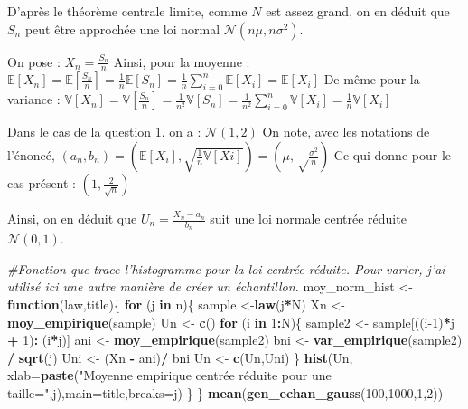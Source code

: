 \documentclass[]{article}
\newenvironment{Shaded}{\begin{snugshade}}{\end{snugshade}}
\newcommand{\CommentTok}[1]{\textcolor[rgb]{0.56,0.35,0.01}{\textit{#1}}}
\newcommand{\ControlFlowTok}[1]{\textcolor[rgb]{0.13,0.29,0.53}{\textbf{#1}}}
\newcommand{\DataTypeTok}[1]{\textcolor[rgb]{0.13,0.29,0.53}{#1}}
\newcommand{\DecValTok}[1]{\textcolor[rgb]{0.00,0.00,0.81}{#1}}
\newcommand{\KeywordTok}[1]{\textcolor[rgb]{0.13,0.29,0.53}{\textbf{#1}}}
\newcommand{\NormalTok}[1]{#1}
\newcommand{\OperatorTok}[1]{\textcolor[rgb]{0.81,0.36,0.00}{\textbf{#1}}}
\newcommand{\StringTok}[1]{\textcolor[rgb]{0.31,0.60,0.02}{#1}}
\begin{document}
D'après le théorème centrale limite, comme \(N\) est assez grand, on en
déduit que \(S_{n}\) peut être approchée une loi normal
\(\mathcal{N}(n\mu,n\sigma^{2})\).

On pose : \({X_{n}} = \frac{S_{n}}{n}\) Ainsi, pour la moyenne :
\(\mathbb{E}[ X_{n}]=\mathbb{E}[\frac{S_{n}}{n}]=\frac{1}{n}\mathbb{E}[S_{n}]=\frac{1}{n}\sum\limits_{i=0}^{n}\mathbb{E}[X_{i}]=\mathbb{E}[X_{i}]\)
De même pour la variance :
\(\mathbb{V}[{ X_{n}}]=\mathbb{V}[\frac{S_{n}}{n}]=\frac{1}{n^{2}}\mathbb{V}[S_{n}]=\frac{1}{n^{2}}\sum\limits_{i=0}^{n}\mathbb{V}[X_{i}]=\frac{1}{n}\mathbb{V}[X_{i}]\)

Dans le cas de la question 1. on a : \(\mathcal{N}(1,2)\) On note, avec
les notations de l'énoncé,
\((a_{n},b_{n})=(\mathbb{E}[X_i],\sqrt{\frac{1}{n}\mathbb{V}[Xi]})=(\mu,\sqrt\frac{\sigma^{2}}{n})\)
Ce qui donne pour le cas présent : \((1,\frac{2}{\sqrt{n}})\)

Ainsi, on en déduit que \(U_{n}=\frac{{X_{n}} - a_{n}}{b_{n}}\) suit une
loi normale centrée réduite \(\mathcal{N}(0,1)\).

\begin{Shaded}
\begin{Highlighting}[]
\CommentTok{#Fonction que trace l'histogramme pour la loi centrée réduite. Pour varier, j'ai utilisé ici une autre manière de créer un échantillon.}
\NormalTok{moy_norm_hist <-}\StringTok{ }\ControlFlowTok{function}\NormalTok{(law,title)\{}
  \ControlFlowTok{for}\NormalTok{ (j }\ControlFlowTok{in}\NormalTok{ n)\{}
\NormalTok{    sample <-}\KeywordTok{law}\NormalTok{(j}\OperatorTok{*}\NormalTok{N)}
\NormalTok{    Xn <-}\StringTok{ }\KeywordTok{moy_empirique}\NormalTok{(sample)}
\NormalTok{    Un <-}\StringTok{ }\KeywordTok{c}\NormalTok{()}
    \ControlFlowTok{for}\NormalTok{ (i }\ControlFlowTok{in} \DecValTok{1}\OperatorTok{:}\NormalTok{N)\{}
\NormalTok{      sample2 <-}\StringTok{ }\NormalTok{sample[((i}\DecValTok{-1}\NormalTok{)}\OperatorTok{*}\NormalTok{j }\OperatorTok{+}\StringTok{ }\DecValTok{1}\NormalTok{)}\OperatorTok{:}\StringTok{ }\NormalTok{(i}\OperatorTok{*}\NormalTok{j)]}
\NormalTok{      ani <-}\StringTok{ }\KeywordTok{moy_empirique}\NormalTok{(sample2)}
\NormalTok{      bni <-}\StringTok{ }\KeywordTok{var_empirique}\NormalTok{(sample2) }\OperatorTok{/}\StringTok{ }\KeywordTok{sqrt}\NormalTok{(j)}
\NormalTok{      Uni <-}\StringTok{ }\NormalTok{(Xn }\OperatorTok{-}\StringTok{ }\NormalTok{ani)}\OperatorTok{/}\StringTok{ }\NormalTok{bni}
\NormalTok{      Un <-}\StringTok{ }\KeywordTok{c}\NormalTok{(Un,Uni)}
\NormalTok{    \}}
    \KeywordTok{hist}\NormalTok{(Un, }\DataTypeTok{xlab=}\KeywordTok{paste}\NormalTok{(}\StringTok{"Moyenne empirique centrée réduite pour une taille="}\NormalTok{,j),}\DataTypeTok{main=}\NormalTok{title,}\DataTypeTok{breaks=}\NormalTok{j)}
\NormalTok{  \}}
\NormalTok{\}}
\KeywordTok{mean}\NormalTok{(}\KeywordTok{gen_echan_gauss}\NormalTok{(}\DecValTok{100}\NormalTok{,}\DecValTok{1000}\NormalTok{,}\DecValTok{1}\NormalTok{,}\DecValTok{2}\NormalTok{))}
\end{Highlighting}
\end{Shaded}
\end{document}
